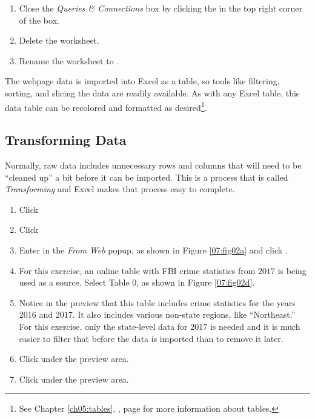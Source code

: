 \begin{enumerate}[resume]
	\item Close the \textit{Queries \& Connections} box by clicking the  in the top right corner of the box.
	\item Delete the  worksheet.
	\item Rename the  worksheet to .
\end{enumerate}

The webpage data is imported into Excel as a table, so tools like filtering, sorting, and slicing the data are readily available. As with any Excel table, this data table can be recolored and formatted as desired\footnote{See Chapter \ref{ch05:tables}, , page \pageref{ch05:tables} for more information about tables.}.

\subsection{Transforming Data}

Normally, raw data includes unnecessary rows and columns that will need to be ``cleaned up'' a bit before it can be imported. This is a process that is called \textit{Transforming} and Excel makes that process easy to complete. 

\begin{enumerate}
	\item {} Click 
	\item {} Click 
	\item Enter  in the \textit{From Web} popup, as shown in Figure \ref{07:fig02a} and click .
	\item For this exercise, an online table with FBI crime statistics from $ 2017 $ is being used as a source. Select Table $ 0 $, as shown in Figure \ref{07:fig02d}.
	\item Notice in the preview that this table includes crime statistics for the years $ 2016 $ and $ 2017 $. It also includes various non-state regions, like ``Northeast.'' For this exercise, only the state-level data for $ 2017 $ is needed and it is much easier to filter that before the data is imported than to remove it later.
	\item {} Click  under the preview area.
	\item {} Click  under the preview area.
\end{enumerate}

